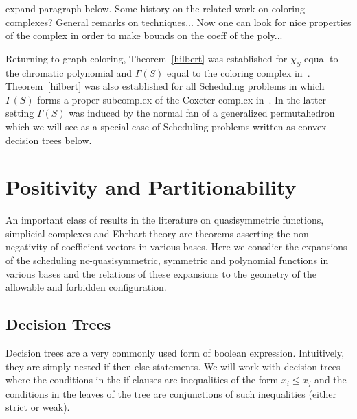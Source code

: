 \documentclass[12pt,reqno]{amsart}
\numberwithin{definition}{section}
\theoremstyle{definition}
\newcommand{\forb}{\Gamma} %
\newcommand{\comment}[1]{\textsf{\footnotesize #1}}
\begin{document}
\comment{expand paragraph below.  Some history on the related work on coloring complexes?  General remarks on techniques... Now one can look for nice properties of the complex in order to make bounds on the coeff of the poly... }

Returning to graph coloring, Theorem~\ref{hilbert} was established
for $\chi_S$ equal to the chromatic polynomial and $\forb(S)$ equal
to the coloring complex in~\cite{Ein}.  Theorem~\ref{hilbert} was also
established for all Scheduling problems in which $\forb(S)$ forms a
proper subcomplex of the Coxeter complex in~\cite{ABK}.  In the latter
setting $\forb(S)$ was induced by the normal fan of a generalized
permutahedron which we will see as a special case of Scheduling problems
written as convex decision trees below.





\section{Positivity and Partitionability}
\label{geometry}

An important class of results in the literature on quasisymmetric
functions, simplicial complexes and Ehrhart theory are theorems
asserting the non-negativity of coefficient vectors in various bases.
Here we consdier the expansions of the scheduling nc-quasisymmetric,
symmetric and polynomial functions in various bases and the relations
of these expansions to the geometry of the allowable and forbidden configuration.  


\subsection{Decision Trees}

Decision trees are a very commonly used form of boolean expression. Intuitively, they are simply nested if-then-else statements. We will work with decision trees where the conditions in the if-clauses are inequalities of the form $x_i \leq x_j$ and the conditions in the leaves of the tree are conjunctions of such inequalities (either strict or weak).
\end{document}
